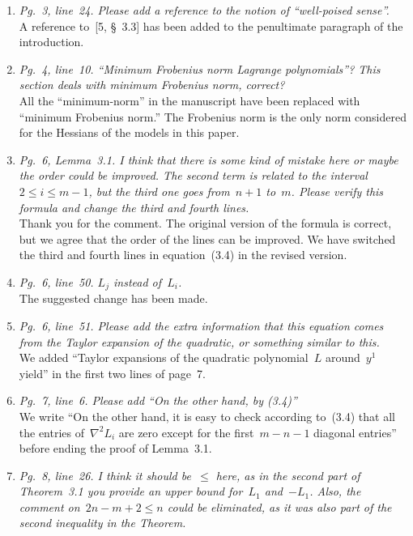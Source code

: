 \documentclass{article}
\begin{document}
\begin{enumerate}
    \item \textit{Pg.~3, line~24. Please add a reference to the notion of ``well-poised sense''.}\\
    A reference to~[5, \S~3.3] has been added to the penultimate paragraph of the introduction.
    \item \textit{Pg.~4, line~10. ``Minimum Frobenius norm Lagrange polynomials''? This section deals with minimum Frobenius norm, correct?}\\
    All the ``minimum-norm'' in the manuscript have been replaced with ``minimum Frobenius norm.''
    The Frobenius norm is the only norm considered for the Hessians of the models in this paper.
    \item \textit{Pg.~6, Lemma~3.1. I think that there is some kind of mistake here or maybe the order could be improved. The second term is related to the interval~$2 \le i \le m - 1$, but the third one goes from~$n + 1$ to~$m$. Please verify this formula and change the third and fourth lines.}\\
    Thank you for the comment.
    The original version of the formula is correct, but we agree that the order of the lines can be improved.
    We have switched the third and fourth lines in equation~(3.4) in the revised version.
    \item \textit{Pg.~6, line~50. $L_j$ instead of~$L_i$.}\\
    The suggested change has been made.
    \item \textit{Pg.~6, line~51. Please add the extra information that this equation comes from the Taylor expansion of the quadratic, or something similar to this.}\\
    We added ``Taylor expansions of the quadratic polynomial~$L$ around~$y^1$ yield'' in the first two lines of page~7.
    \item \textit{Pg.~7, line~6. Please add ``On the other hand, by (3.4)''}\\
    We write ``On the other hand, it is easy to check according to~(3.4) that all the entries of~$\nabla^2 L_i$ are zero except for the first~$m - n - 1$ diagonal entries'' before ending the proof of Lemma~3.1.
    \item \textit{Pg.~8, line~26. I think it should be~$\le$ here, as in the second part of Theorem~3.1 you provide an upper bound for~$L_1$ and~$-L_1$. Also, the comment on~$2n - m + 2 \le n$ could be eliminated, as it was also part of the second inequality in the Theorem.}\\

\end{enumerate}
\end{document}
